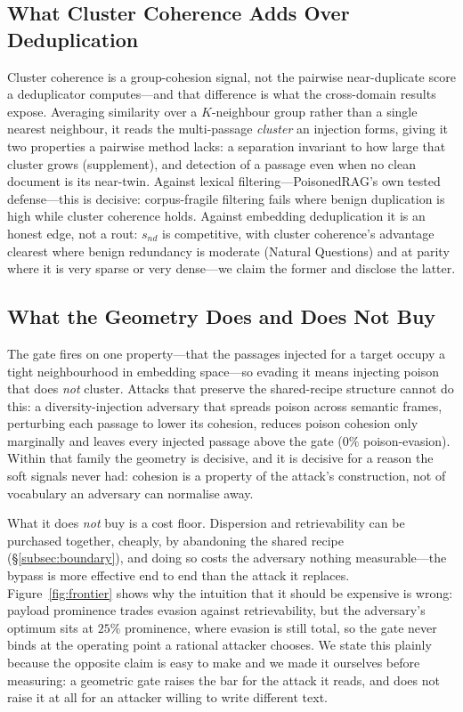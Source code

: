 \documentclass[10pt,journal,compsoc]{IEEEtran}
\begin{document}
\subsection{What Cluster Coherence Adds Over Deduplication}
Cluster coherence is a group-cohesion signal, not the pairwise near-duplicate score a
deduplicator computes---and that difference is what the cross-domain results expose. Averaging
similarity over a $K$-neighbour group rather than a single nearest neighbour, it reads the
multi-passage \emph{cluster} an injection forms, giving it two properties a pairwise method
lacks: a separation invariant to how large that cluster grows (supplement), and
detection of a passage even when no clean document is its near-twin. Against lexical
filtering---PoisonedRAG's own tested defense---this is decisive: corpus-fragile filtering fails
where benign duplication is high while cluster coherence holds. Against embedding deduplication
it is an honest edge, not a rout: $s_{nd}$ is competitive, with cluster coherence's advantage
clearest where benign redundancy is moderate (Natural Questions) and at parity where it is very
sparse or very dense---we claim the former and disclose the latter.

\subsection{What the Geometry Does and Does Not Buy}
The gate fires on one property---that the passages injected for a target occupy a tight
neighbourhood in embedding space---so evading it means injecting poison that does \emph{not}
cluster. Attacks that preserve the shared-recipe structure cannot do this: a diversity-injection
adversary that spreads poison across semantic frames, perturbing each passage to lower its
cohesion, reduces poison cohesion only marginally and leaves every injected passage above the
gate ($0\%$ poison-evasion). Within that family the geometry is decisive, and it is decisive for
a reason the soft signals never had: cohesion is a property of the attack's construction, not of
vocabulary an adversary can normalise away.

What it does \emph{not} buy is a cost floor. Dispersion and retrievability can be purchased
together, cheaply, by abandoning the shared recipe (\S\ref{subsec:boundary}), and doing so costs
the adversary nothing measurable---the bypass is more effective end to end than the attack it
replaces. Figure~\ref{fig:frontier} shows why the intuition that it should be expensive is
wrong: payload prominence trades evasion against retrievability, but the adversary's optimum
sits at $25\%$ prominence, where evasion is still total, so the gate never binds at the
operating point a rational attacker chooses. We state this plainly because the opposite claim is
easy to make and we made it ourselves before measuring: a geometric gate raises the bar for the
attack it reads, and does not raise it at all for an attacker willing to write different text.
\end{document}
